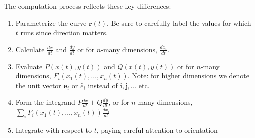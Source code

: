 \noindent The computation process reflects these key differences:
\begin{enumerate}
    \item Parameterize the curve $\mathbf{r}(t)$. Be sure to carefully label the values for which $t$ runs since direction matters.
    \item Calculate $\frac{dx}{dt}$ and $\frac{dy}{dt}$ or for $n$-many dimensions, $\frac{dx_i}{dt}$.
    \item Evaluate $P(x(t),y(t))$ and $Q(x(t),y(t))$ or for $n$-many dimensions, $F_i(x_1(t),\ldots,x_n(t))$. Note: for higher dimensions we denote the unit vector $\mathbf{e}_i$ or $\hat{e}_i$ instead of $\mathbf{i}, \mathbf{j},...$ etc.
    \item Form the integrand $P\frac{dx}{dt} + Q\frac{dy}{dt}$, or for $n$-many dimensions, $\sum_i F_i(x_1(t),\ldots,x_n(t))\frac{dx_i}{dt}$
    \item Integrate with respect to $t$, paying careful attention to orientation
\end{enumerate}


